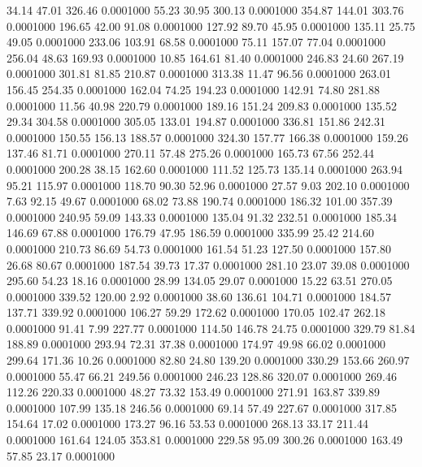   34.14   47.01  326.46   0.0001000
  55.23   30.95  300.13   0.0001000
 354.87  144.01  303.76   0.0001000
 196.65   42.00   91.08   0.0001000
 127.92   89.70   45.95   0.0001000
 135.11   25.75   49.05   0.0001000
 233.06  103.91   68.58   0.0001000
  75.11  157.07   77.04   0.0001000
 256.04   48.63  169.93   0.0001000
  10.85  164.61   81.40   0.0001000
 246.83   24.60  267.19   0.0001000
 301.81   81.85  210.87   0.0001000
 313.38   11.47   96.56   0.0001000
 263.01  156.45  254.35   0.0001000
 162.04   74.25  194.23   0.0001000
 142.91   74.80  281.88   0.0001000
  11.56   40.98  220.79   0.0001000
 189.16  151.24  209.83   0.0001000
 135.52   29.34  304.58   0.0001000
 305.05  133.01  194.87   0.0001000
 336.81  151.86  242.31   0.0001000
 150.55  156.13  188.57   0.0001000
 324.30  157.77  166.38   0.0001000
 159.26  137.46   81.71   0.0001000
 270.11   57.48  275.26   0.0001000
 165.73   67.56  252.44   0.0001000
 200.28   38.15  162.60   0.0001000
 111.52  125.73  135.14   0.0001000
 263.94   95.21  115.97   0.0001000
 118.70   90.30   52.96   0.0001000
  27.57    9.03  202.10   0.0001000
   7.63   92.15   49.67   0.0001000
  68.02   73.88  190.74   0.0001000
 186.32  101.00  357.39   0.0001000
 240.95   59.09  143.33   0.0001000
 135.04   91.32  232.51   0.0001000
 185.34  146.69   67.88   0.0001000
 176.79   47.95  186.59   0.0001000
 335.99   25.42  214.60   0.0001000
 210.73   86.69   54.73   0.0001000
 161.54   51.23  127.50   0.0001000
 157.80   26.68   80.67   0.0001000
 187.54   39.73   17.37   0.0001000
 281.10   23.07   39.08   0.0001000
 295.60   54.23   18.16   0.0001000
  28.99  134.05   29.07   0.0001000
  15.22   63.51  270.05   0.0001000
 339.52  120.00    2.92   0.0001000
  38.60  136.61  104.71   0.0001000
 184.57  137.71  339.92   0.0001000
 106.27   59.29  172.62   0.0001000
 170.05  102.47  262.18   0.0001000
  91.41    7.99  227.77   0.0001000
 114.50  146.78   24.75   0.0001000
 329.79   81.84  188.89   0.0001000
 293.94   72.31   37.38   0.0001000
 174.97   49.98   66.02   0.0001000
 299.64  171.36   10.26   0.0001000
  82.80   24.80  139.20   0.0001000
 330.29  153.66  260.97   0.0001000
  55.47   66.21  249.56   0.0001000
 246.23  128.86  320.07   0.0001000
 269.46  112.26  220.33   0.0001000
  48.27   73.32  153.49   0.0001000
 271.91  163.87  339.89   0.0001000
 107.99  135.18  246.56   0.0001000
  69.14   57.49  227.67   0.0001000
 317.85  154.64   17.02   0.0001000
 173.27   96.16   53.53   0.0001000
 268.13   33.17  211.44   0.0001000
 161.64  124.05  353.81   0.0001000
 229.58   95.09  300.26   0.0001000
 163.49   57.85   23.17   0.0001000
